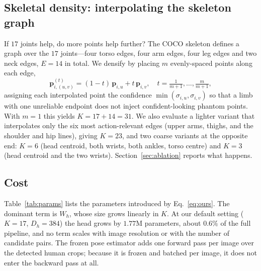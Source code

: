 \documentclass[12pt,a4paper]{article}
\newcommand{\bp}{\mathbf{p}}
\begin{document}
\subsection{Skeletal density: interpolating the skeleton graph}
\label{sec:density}

If $17$ joints help, do more points help further? The COCO skeleton defines a
graph over the $17$ joints---four torso edges, four arm edges, four leg edges
and two neck edges, $E = 14$ in total. We densify by placing $m$ evenly-spaced
points along each edge,
\begin{equation}
\bp^{(t)}_{i,(u,v)} = (1-t)\,\bp_{i,u} + t\,\bp_{i,v},
\quad t = \tfrac{1}{m+1},\dots,\tfrac{m}{m+1},
\end{equation}
assigning each interpolated point the confidence
$\min(\sigma_{i,u}, \sigma_{i,v})$ so that a limb with one unreliable endpoint
does not inject confident-looking phantom points. With $m=1$ this yields
$K = 17 + 14 = 31$. We also evaluate a lighter variant that interpolates only
the six most action-relevant edges (upper arms, thighs, and the shoulder and
hip lines), giving $K = 23$, and two coarse variants at the opposite end:
$K = 6$ (head centroid, both wrists, both ankles, torso centre) and $K = 3$
(head centroid and the two wrists). Section~\ref{sec:ablation} reports what
happens.

\subsection{Cost}
\label{sec:cost}

Table~\ref{tab:params} lists the parameters introduced by
Eq.~\eqref{eq:ours}. The dominant term is $W_h$, whose size grows linearly in
$K$. At our default setting ($K{=}17$, $D_h{=}384$) the head grows by
$1.77$M parameters, about $0.6\%$ of the full pipeline, and no term scales with
image resolution or with the number of candidate pairs. The frozen pose
estimator adds one forward pass per image over the detected human crops; because
it is frozen and batched per image, it does not enter the backward pass at all.
\end{document}
